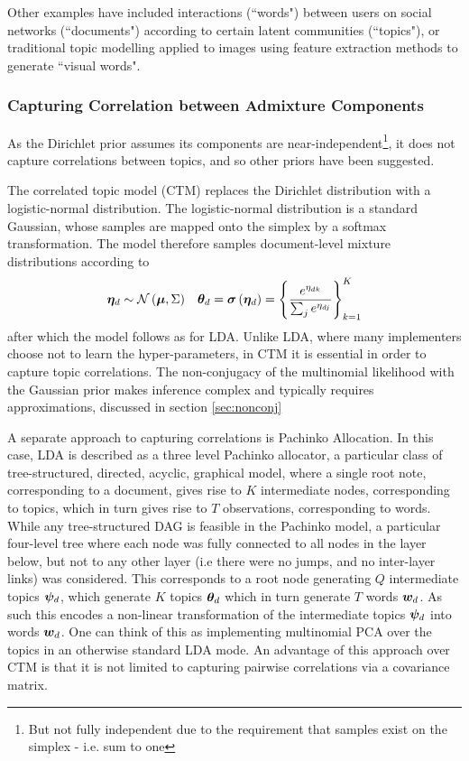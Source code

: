 Other examples have included interactions (``words") between users on social networks (``documents") according to certain latent communities (``topics")\cite{Zhang2007}, or traditional topic modelling applied to images\cite{Philbin2008} using feature extraction methods to generate ``visual words". 

\subsubsection{Capturing Correlation between Admixture Components}

As the Dirichlet prior assumes its components are near-independent\footnote{But not fully independent due to the requirement that samples exist on the simplex - i.e. sum to one}, it does not capture correlations between topics, and so other priors have been suggested.

The correlated topic model\cite{Blei2006} (CTM) replaces the Dirichlet distribution with a logistic-normal distribution.  The logistic-normal distribution is a standard Gaussian, whose samples are mapped onto the simplex by a softmax transformation. The model therefore samples document-level mixture distributions according to
\begin{align}
\bm \eta_d & \sim \mathcal{N} \left( {\bm \mu}, {\Sigma} \right) & { \bm \theta_d } = \bm \sigma\left(\bm \eta_d\right) = \left\{\frac{e^{\eta_{dk}}}{\sum_j e^{\eta_{dj}}}\right\}_{k=1}^K
\end{align}
after which the model follows as for LDA. Unlike LDA, where many implementers choose not to learn the hyper-parameters, in CTM it is essential in order to capture topic correlations. The non-conjugacy of the multinomial likelihood with the Gaussian prior makes inference complex and typically requires approximations, discussed in section \ref{sec:nonconj}

A separate approach to capturing correlations is Pachinko Allocation\cite{Li2006}. In this case, LDA is described as a three level Pachinko allocator, a particular class of tree-structured, directed, acyclic, graphical model, where a single root note, corresponding to a document, gives rise to $K$ intermediate nodes, corresponding to topics, which in turn gives rise to $T$ observations, corresponding to words. While any tree-structured DAG is feasible in the Pachinko model, a particular four-level tree where each node was fully connected to all nodes in the layer below, but not to any other layer (i.e there were no jumps, and no inter-layer links) was considered. This corresponds to a root node generating $Q$ intermediate topics $\bm \psi_d$, which generate $K$ topics ${ \bm \theta_d }$ which in turn generate $T$ words ${ \bm w_d }$. As such this encodes a non-linear transformation of the intermediate topics $\bm \psi_d$ into words ${ \bm w_d }$. One can think of this as implementing multinomial PCA over the topics in an otherwise standard LDA mode. An advantage of this approach over CTM is that it is not limited to capturing pairwise correlations via a covariance matrix.

